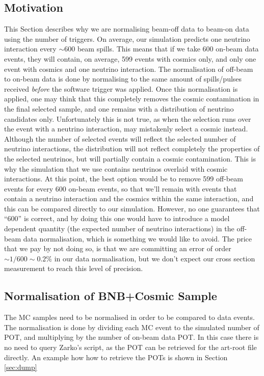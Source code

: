 \documentclass[a4paper, oneside, 12pt, onecolumn]{article}
\begin{document}
\subsection{Motivation}

This Section describes why we are normalising beam-off data to beam-on data using the number of triggers.
On average, our simulation predicts one neutrino interaction every $\sim 600$ beam spills. This means that if we take 600 on-beam data events, they will contain, on average, 599 events with cosmics only, and only one event with cosmics and one neutrino interaction. The normalisation of off-beam to on-beam data is done by normalising to the same amount of spills/pulses received \emph{before} the software trigger was applied. Once this normalisation is applied, one may think that this completely removes the cosmic contamination in the final selected sample, and one remains with a distribution of neutrino candidates only. Unfortunately this is not true, as when the selection runs over the event with a neutrino interaction, may mistakenly select a cosmic instead. Although the number of selected events will reflect the selected number of neutrino interactions, the distribution will not reflect completely the properties of the selected neutrinos, but will partially contain a cosmic contamination. This is why the simulation that we use contains neutrinos overlaid with cosmic interactions. At this point, the best option would be to remove 599 off-beam events for every 600 on-beam events, so that we'll remain with events that contain a neutrino interaction and the cosmics within the same interaction, and this can be compared directly to our simulation. However, no one guarantees that ``600'' is correct, and by doing this one would have to introduce a model dependent quantity (the expected number of neutrino interactions) in the off-beam data normalisation, which is something we would like to avoid. The price that we pay by not doing so, is that we are committing an error of order $\sim1/600\sim0.2\%$ in our data normalisation, but we don't expect our cross section measurement to reach this level of precision. 


 


\subsection{Normalisation of BNB+Cosmic Sample}
The MC samples need to be normalised in order to be compared to data events. The normalisation is done by dividing each MC event to the simulated number of POT, and multiplying by the number of on-beam data POT. 
In this case there is no need to query Zarko's script, as the POT can be retrieved for the art-root file directly. An example how how to retrieve the POTs is shown in Section \ref{sec:dump}
  
\end{document}
